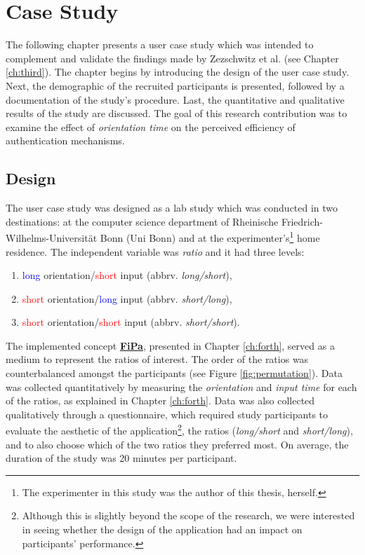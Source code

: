 
\chapter{Case Study}\label{ch:fifth}

The following chapter presents a user case study which was intended to complement and validate the findings made by Zezschwitz et al. \cite{Zezschwitz} (see Chapter \ref{ch:third}). The chapter begins by introducing the design of the user case study. Next, the demographic of the recruited participants is presented, followed by a documentation of the study's procedure. Last, the quantitative and qualitative results of the study are discussed. The goal of this research contribution was to examine the effect of \textit{orientation time} on the perceived efficiency of authentication mechanisms. 

\section{Design} \label{5.1}

The user case study was designed as a lab study which was conducted in two destinations: at the computer science department of Rheinische Friedrich-Wilhelms-Universit{\"a}t Bonn (Uni Bonn) and at the experimenter's\footnote{The experimenter in this study was the author of this thesis, herself.} home residence. The independent variable was \textit{ratio} and it had three levels:
\begin{enumerate}
    \item \textcolor{blue}{long} orientation/\textcolor{red}{short} input (abbrv. \textit{long/short}), 
    \item \textcolor{red}{short} orientation/\textcolor{blue}{long} input (abbrv. \textit{short/long}), 
    \item \textcolor{red}{short} orientation/\textcolor{red}{short} input (abbrv. \textit{short/short}). 
\end{enumerate}

The implemented concept \underline{\textbf{FiPa}}, presented in Chapter \ref{ch:forth}, served as a medium to represent the ratios of interest. The order of the ratios was counterbalanced amongst the participants (see Figure \ref{fig:permutation}). Data was collected quantitatively by measuring the \textit{orientation} and \textit{input time} for each of the ratios, as explained in Chapter \ref{ch:forth}. Data was also collected qualitatively through a questionnaire, which required study participants to evaluate the aesthetic of the application\footnote{Although this is slightly beyond the scope of the research, we were interested in seeing whether the design of the application had an impact on participants' performance.}, the ratios (\textit{long/short} and \textit{short/long}), and to also choose which of the two ratios they preferred most. On average, the duration of the study was 20 minutes per participant. 

